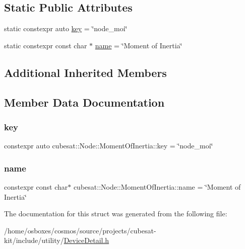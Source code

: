 \subsection*{Static Public Attributes}
\begin{DoxyCompactItemize}
\item 
static constexpr auto \hyperlink{structcubesat_1_1Node_1_1MomentOfInertia_a728df4de3784819e48a002826e3b7d6e}{key} = \char`\"{}node\+\_\+moi\char`\"{}
\item 
static constexpr const char $\ast$ \hyperlink{structcubesat_1_1Node_1_1MomentOfInertia_aa2921ca8e0670caa8de1e09b47a82917}{name} = \char`\"{}Moment of Inertia\char`\"{}
\end{DoxyCompactItemize}
\subsection*{Additional Inherited Members}


\subsection{Member Data Documentation}
\mbox{\label{structcubesat_1_1Node_1_1MomentOfInertia_a728df4de3784819e48a002826e3b7d6e}} 
\subsubsection{\texorpdfstring{key}{key}}
{\footnotesize\ttfamily constexpr auto cubesat\+::\+Node\+::\+Moment\+Of\+Inertia\+::key = \char`\"{}node\+\_\+moi\char`\"{}\hspace{0.3cm}{\ttfamily [static]}}

\mbox{\label{structcubesat_1_1Node_1_1MomentOfInertia_aa2921ca8e0670caa8de1e09b47a82917}} 
\subsubsection{\texorpdfstring{name}{name}}
{\footnotesize\ttfamily constexpr const char$\ast$ cubesat\+::\+Node\+::\+Moment\+Of\+Inertia\+::name = \char`\"{}Moment of Inertia\char`\"{}\hspace{0.3cm}{\ttfamily [static]}}



The documentation for this struct was generated from the following file\+:\begin{DoxyCompactItemize}
\item 
/home/osboxes/cosmos/source/projects/cubesat-\/kit/include/utility/\hyperlink{DeviceDetail_8h}{Device\+Detail.\+h}\end{DoxyCompactItemize}
